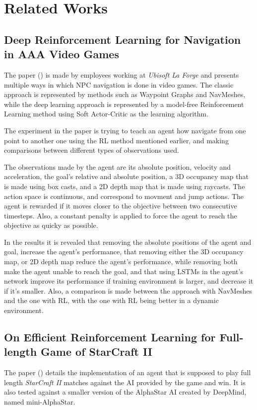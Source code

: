 \chapter{Related Works}

\section{Deep Reinforcement Learning for Navigation in AAA Video Games}
The paper (\cite{alonso2020deeplearningnavigation}) is made by employees working at \emph{Ubisoft La Forge} and presents multiple ways in which NPC navigation is done in video games. The classic approach is represented by methods such as Waypoint Graphs and NavMeshes, while the deep learning approach is represented by a model-free Reinforcement Learning method using Soft Actor-Critic as the learning algorithm. 

The experiment in the paper is trying to teach an agent how navigate from one point to another one using the RL method mentioned earlier, and making comparisons between different types of observations used.

The observations made by the agent are its absolute position, velocity and acceleration, the goal's relative and absolute position, a 3D occupancy map that is made using box casts, and a 2D depth map that is made using raycasts. The action space is continuous, and correspond to movment and jump actions. The agent is rewarded if it moves closer to the objective between two consecutive timesteps. Also, a constant penalty is applied to force the agent to reach the objective as quicky as possible.

In the results it is revealed that removing the absolute positions of the agent and goal, increase the agent's performance, that removing either the 3D occupancy map, or 2D depth map reduce the agent's performance, while removing both make the agent unable to reach the goal, and that using LSTMs in the agent's network improve its performance if training environment is larger, and decrease it if it's smaller. Also, a comparison is made between the approach with NavMeshes and the one with RL, with the one with RL being better in a dynamic environment.



\section{On Efficient Reinforcement Learning for Full-length Game of StarCraft II}
The paper (\cite{liu2022efficientstarcraft2}) details the implementation of an agent that is supposed to play full length \emph{StarCraft II} matches against the AI provided by the game and win. It is also tested against a smaller version of the AlphaStar AI created by DeepMind, named mini-AlphaStar.

